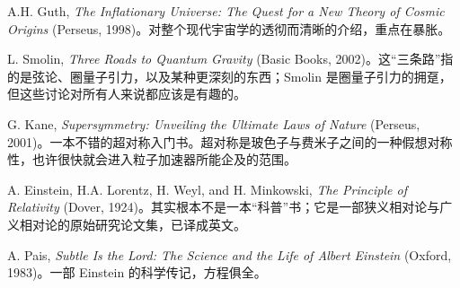 A.H. Guth, \emph{The Inflationary Universe: The Quest for a New Theory of Cosmic Origins} (Perseus, 1998)。对整个现代宇宙学的透彻而清晰的介绍，重点在暴胀。

L. Smolin, \emph{Three Roads to Quantum Gravity} (Basic Books, 2002)。这“三条路”指的是弦论、圈量子引力，以及某种更深刻的东西；Smolin 是圈量子引力的拥趸，但这些讨论对所有人来说都应该是有趣的。

G. Kane, \emph{Supersymmetry: Unveiling the Ultimate Laws of Nature} (Perseus, 2001)。一本不错的超对称入门书。超对称是玻色子与费米子之间的一种假想对称性，也许很快就会进入粒子加速器所能企及的范围。

A. Einstein, H.A. Lorentz, H. Weyl, and H. Minkowski, \emph{The Principle of Relativity} (Dover, 1924)。其实根本不是一本“科普”书；它是一部狭义相对论与广义相对论的原始研究论文集，已译成英文。

A. Pais, \emph{Subtle Is the Lord: The Science and the Life of Albert Einstein} (Oxford, 1983)。一部 Einstein 的科学传记，方程俱全。

